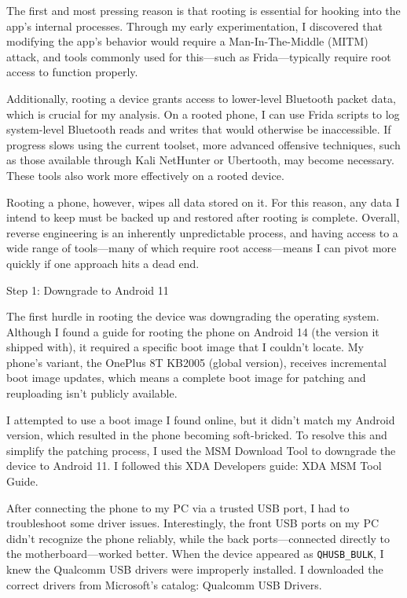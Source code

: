 The first and most pressing reason is that rooting is essential for hooking into the app's internal processes. Through my early experimentation, I discovered that modifying the app’s behavior would require a Man-In-The-Middle (MITM) attack, and tools commonly used for this—such as Frida—typically require root access to function properly.

Additionally, rooting a device grants access to lower-level Bluetooth packet data, which is crucial for my analysis. On a rooted phone, I can use Frida scripts to log system-level Bluetooth reads and writes that would otherwise be inaccessible. If progress slows using the current toolset, more advanced offensive techniques, such as those available through Kali NetHunter or Ubertooth, may become necessary. These tools also work more effectively on a rooted device.

Rooting a phone, however, wipes all data stored on it. For this reason, any data I intend to keep must be backed up and restored after rooting is complete. Overall, reverse engineering is an inherently unpredictable process, and having access to a wide range of tools—many of which require root access—means I can pivot more quickly if one approach hits a dead end.

Step 1: Downgrade to Android 11

The first hurdle in rooting the device was downgrading the operating system. Although I found a guide for rooting the phone on Android 14 (the version it shipped with), it required a specific boot image that I couldn’t locate. My phone’s variant, the OnePlus 8T KB2005 (global version), receives incremental boot image updates, which means a complete boot image for patching and reuploading isn't publicly available.

I attempted to use a boot image I found online, but it didn’t match my Android version, which resulted in the phone becoming soft-bricked. To resolve this and simplify the patching process, I used the MSM Download Tool to downgrade the device to Android 11. I followed this XDA Developers guide: XDA MSM Tool Guide.

After connecting the phone to my PC via a trusted USB port, I had to troubleshoot some driver issues. Interestingly, the front USB ports on my PC didn’t recognize the phone reliably, while the back ports—connected directly to the motherboard—worked better. When the device appeared as \texttt{QHUSB\_BULK}, I knew the Qualcomm USB drivers were improperly installed. I downloaded the correct drivers from Microsoft’s catalog: Qualcomm USB Drivers.

